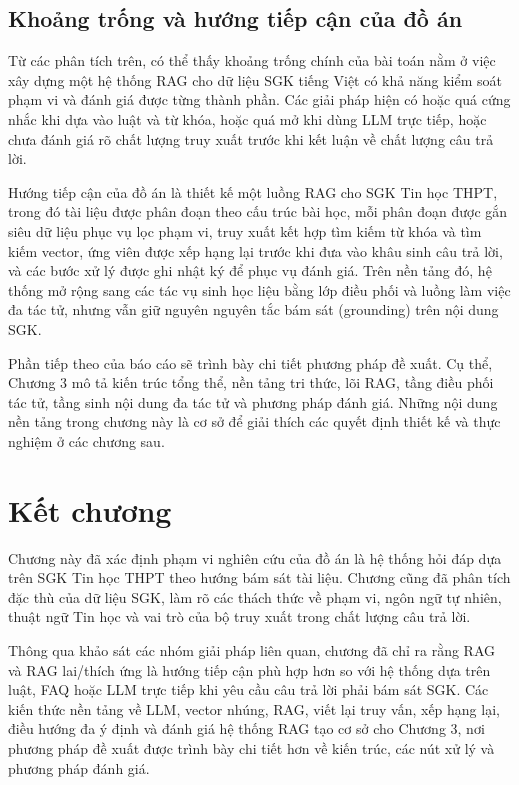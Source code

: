 \documentclass[../DoAn.tex]{subfiles}
\begin{document}
\subsection{Khoảng trống và hướng tiếp cận của đồ án}

Từ các phân tích trên, có thể thấy khoảng trống chính của bài toán nằm ở việc xây dựng một hệ thống RAG cho dữ liệu SGK tiếng Việt có khả năng kiểm soát phạm vi và đánh giá được từng thành phần. Các giải pháp hiện có hoặc quá cứng nhắc khi dựa vào luật và từ khóa, hoặc quá mở khi dùng LLM trực tiếp, hoặc chưa đánh giá rõ chất lượng truy xuất trước khi kết luận về chất lượng câu trả lời.

Hướng tiếp cận của đồ án là thiết kế một luồng RAG cho SGK Tin học THPT, trong đó tài liệu được phân đoạn theo cấu trúc bài học, mỗi phân đoạn được gắn siêu dữ liệu phục vụ lọc phạm vi, truy xuất kết hợp tìm kiếm từ khóa và tìm kiếm vector, ứng viên được xếp hạng lại trước khi đưa vào khâu sinh câu trả lời, và các bước xử lý được ghi nhật ký để phục vụ đánh giá. Trên nền tảng đó, hệ thống mở rộng sang các tác vụ sinh học liệu bằng lớp điều phối và luồng làm việc đa tác tử, nhưng vẫn giữ nguyên nguyên tắc bám sát (grounding) trên nội dung SGK.

Phần tiếp theo của báo cáo sẽ trình bày chi tiết phương pháp đề xuất. Cụ thể, Chương 3 mô tả kiến trúc tổng thể, nền tảng tri thức, lõi RAG, tầng điều phối tác tử, tầng sinh nội dung đa tác tử và phương pháp đánh giá. Những nội dung nền tảng trong chương này là cơ sở để giải thích các quyết định thiết kế và thực nghiệm ở các chương sau.

\section{Kết chương}

Chương này đã xác định phạm vi nghiên cứu của đồ án là hệ thống hỏi đáp dựa trên SGK Tin học THPT theo hướng bám sát tài liệu. Chương cũng đã phân tích đặc thù của dữ liệu SGK, làm rõ các thách thức về phạm vi, ngôn ngữ tự nhiên, thuật ngữ Tin học và vai trò của bộ truy xuất trong chất lượng câu trả lời.

Thông qua khảo sát các nhóm giải pháp liên quan, chương đã chỉ ra rằng RAG và RAG lai/thích ứng là hướng tiếp cận phù hợp hơn so với hệ thống dựa trên luật, FAQ hoặc LLM trực tiếp khi yêu cầu câu trả lời phải bám sát SGK. Các kiến thức nền tảng về LLM, vector nhúng, RAG, viết lại truy vấn, xếp hạng lại, điều hướng đa ý định và đánh giá hệ thống RAG tạo cơ sở cho Chương 3, nơi phương pháp đề xuất được trình bày chi tiết hơn về kiến trúc, các nút xử lý và phương pháp đánh giá.
\end{document}
